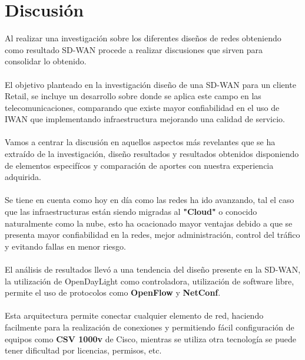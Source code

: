 \chapter{Discusión}
\label{cha:Discusión}

Al realizar una investigación sobre los diferentes diseños de redes obteniendo como resultado SD-WAN procede a realizar discusiones que sirven para consolidar lo obtenido.
\\
\\
El objetivo planteado en la investigación diseño de una SD-WAN para un cliente Retail, se incluye un desarrollo sobre donde se aplica este campo en las telecomunicaciones, comparando que existe mayor confiabilidad en el uso de IWAN que implementando infraestructura mejorando una calidad de servicio.
\\
\\
Vamos a centrar la discusión en aquellos aspectos más revelantes que se ha extraído de la investigación, diseño resultados y resultados obtenidos disponiendo de elementos especifícos y comparación de aportes con nuestra experiencia adquirida.
\\
\\
Se tiene en cuenta como hoy en día como las redes ha ido avanzando, tal el caso que las infraestructuras están siendo migradas al \textbf{"Cloud"} o conocido naturalmente como la nube, esto ha ocacionado mayor ventajas debido a que se presenta mayor confiabilidad en la redes, mejor administración, control del tráfico y evitando fallas en menor riesgo.
\\
\\
El análisis de resultados llevó a una tendencia del diseño presente en la SD-WAN, la utilización de OpenDayLight como controladora, utilización de software libre, permite el uso de protocolos como \textbf{OpenFlow} y \textbf{NetConf}.
\\
\\
Esta arquitectura permite conectar cualquier elemento de red, haciendo facilmente para la realización de conexiones y permitiendo fácil configuración de equipos como \textbf{CSV 1000v} de Cisco, mientras se utiliza otra tecnología se puede tener dificultad por licencias, permisos, etc.
\\
\\
